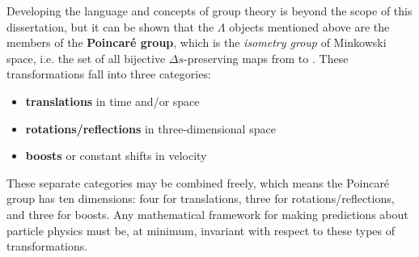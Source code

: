 Developing the language and concepts of group theory is beyond the scope of this dissertation, but it can be shown that the $\Lambda$ objects mentioned above are the members of the \textbf{Poincar\'{e} group}, which is
the \textit{isometry group} of Minkowski space, i.e. the set of all bijective $\Delta s$-preserving maps from \MinkSpace to \MinkSpace.
These transformations fall into three categories:
\begin{itemize}
\itemsep0em 
\item \textbf{translations} in time and/or space
\item \textbf{rotations/reflections} in three-dimensional space
\item \textbf{boosts} or constant shifts in velocity
\end{itemize}
These separate categories may be combined freely, which means the Poincar\'{e} group has ten dimensions: four for translations, three for rotations/reflections, and three for boosts.
Any mathematical framework for making predictions about particle physics must be, at minimum, invariant with respect to these types of transformations.

